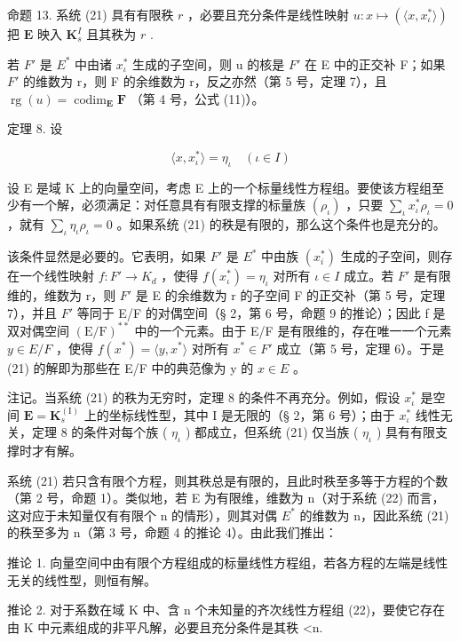命题 13. 系统 (21) 具有有限秩 \(r\) ，必要且充分条件是线性映射 \(u: x \mapsto (\langle x, x_{\iota}^* \rangle)\) 把 \(\mathbf{E}\) 映入 \(\mathbf{K}_s^I\) 且其秩为 \(r\) .

若 \(F'\) 是 \(E^{*}\) 中由诸 \(x_{\iota}^{*}\) 生成的子空间，则 u 的核是 \(F'\) 在 E 中的正交补 F；如果 \(F'\) 的维数为 r，则 F 的余维数为 r，反之亦然（第 5 号，定理 7），且 \(\operatorname{rg}(u) = \operatorname{codim}_{\mathbf{E}} \mathbf{F}\) （第 4 号，公式 (11)）。

定理 8. 设

\[
\langle x, x _ {\iota} ^ {*} \rangle = \eta_ {\iota} \quad (\iota \in I)\tag{21}
\]

设 E 是域 K 上的向量空间，考虑 E 上的一个标量线性方程组。要使该方程组至少有一个解，必须满足：对任意具有有限支撑的标量族 \((\rho_{\iota})\) ，只要 \(\sum_{\iota} x_{\iota}^{*}\rho_{\iota}=0\) ，就有 \(\sum_{\iota}\eta_{\iota}\rho_{\iota}=0\) 。如果系统 (21) 的秩是有限的，那么这个条件也是充分的。

该条件显然是必要的。它表明，如果 \(F'\) 是 \(E^{*}\) 中由族 \((x_{i}^{*})\) 生成的子空间，则存在一个线性映射 \(f:F'\to K_{d}\) ，使得 \(f(x_{\iota}^{*})=\eta_{\iota}\) 对所有 \(\iota\in I\) 成立。若 \(F'\) 是有限维的，维数为 r，则 \(F'\) 是 E 的余维数为 r 的子空间 F 的正交补（第 5 号，定理 7），并且 \(F'\) 等同于 E/F 的对偶空间（§ 2，第 6 号，命题 9 的推论）；因此 f 是双对偶空间 \((\mathrm{E}/\mathrm{F})^{**}\) 中的一个元素。由于 E/F 是有限维的，存在唯一一个元素 \(y\in E/F\) ，使得 \(f(x^{*})=\langle y,x^{*}\rangle\) 对所有 \(x^{*}\in F'\) 成立（第 5 号，定理 6）。于是 (21) 的解即为那些在 E/F 中的典范像为 y 的 \(x\in E\) 。

注记。当系统 (21) 的秩为无穷时，定理 8 的条件不再充分。例如，假设 \(x_{\iota}^{*}\) 是空间 \(\mathbf{E} = \mathbf{K}_{s}^{(\mathrm{I})}\) 上的坐标线性型，其中 I 是无限的（§ 2，第 6 号）；由于 \(x_{\iota}^{*}\) 线性无关，定理 8 的条件对每个族 ( \(\eta_{\iota}\) ) 都成立，但系统 (21) 仅当族 ( \(\eta_{\iota}\) ) 具有有限支撑时才有解。

系统 (21) 若只含有限个方程，则其秩总是有限的，且此时秩至多等于方程的个数（第 2 号，命题 1）。类似地，若 E 为有限维，维数为 n（对于系统 (22) 而言，这对应于未知量仅有有限个 n 的情形），则其对偶 \(E^{*}\) 的维数为 n，因此系统 (21) 的秩至多为 n（第 3 号，命题 4 的推论 4）。由此我们推出：

推论 1. 向量空间中由有限个方程组成的标量线性方程组，若各方程的左端是线性无关的线性型，则恒有解。

推论 2. 对于系数在域 K 中、含 n 个未知量的齐次线性方程组 (22)，要使它存在由 K 中元素组成的非平凡解，必要且充分条件是其秩 \textless n.

